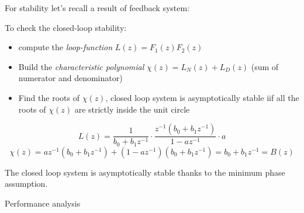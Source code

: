 
\begin{remark}
    For stability let's recall a result of feedback system:
    \begin{figure}[H]
        \centering
    \end{figure}

    To check the closed-loop stability:
    \begin{itemize}
        \item compute the \emph{loop-function} $L(z) = F_1(z) F_2(z)$
        \item Build the \emph{characteristic polynomial} $\chi(z) = L_N(z) + L_D(z)$ (sum of numerator and denominator)
        \item Find the roots of $\chi(z)$, closed loop system is asymptotically stable iif all the roots of $\chi(z)$ are strictly inside the unit circle
    \end{itemize}
\end{remark}

\[
    L(z) = \frac{1}{b_0+b_1z^{-1}} \cdot \frac{z^{-1}(b_0+b_1z^{-1})}{1-az^{-1}} \cdot a
\]
\[
    \chi(z) = az^{-1}(b_0+b_1z^{-1}) + (1-az^{-1})(b_0+b_1z^{-1}) = b_0+b_1z^{-1} = B(z)
\]

The closed loop system is asymptotically stable thanks to the minimum phase assumption.

Performance analysis
\begin{figure}[H]
    \centering
\end{figure}


